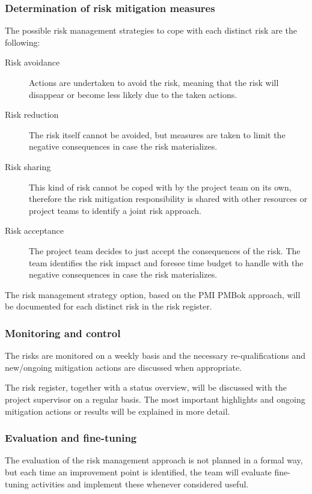 \subsubsection{Determination of risk mitigation measures}
The possible risk management strategies to cope with each distinct risk are the following:
\begin{description}
	\item [Risk avoidance]
	Actions are undertaken to avoid the risk, meaning that the risk will disappear or become less likely due to the taken actions.
	\item[Risk reduction]
	The risk itself cannot be avoided, but measures are taken to limit the negative consequences in case the risk materializes.
	\item[Risk sharing]
	This kind of risk cannot be coped with by the project team on its own, therefore the risk mitigation responsibility is shared with other resources or project teams to identify a joint risk approach.
	\item[Risk acceptance]
	The project team decides to just accept the consequences of the risk.
	The team identifies the risk impact and foresee time budget to handle with the negative consequences in case the risk materializes.
\end {description}

\noindent
The risk management strategy option, based on the PMI PMBok approach, will be documented for each distinct risk in the risk register.

\subsubsection{Monitoring and control}
The risks are monitored on a weekly basis and the necessary re-qualifications and new/ongoing mitigation actions are discussed when appropriate.

The risk register, together with a status overview, will be discussed with the project supervisor on a regular basis.
The most important highlights and ongoing mitigation actions or results will be explained in more detail.

\subsubsection{Evaluation and fine-tuning}
The evaluation of the risk management approach is not planned in a formal way, but each time an improvement point is identified, the team will evaluate fine-tuning activities and implement these whenever considered useful.

